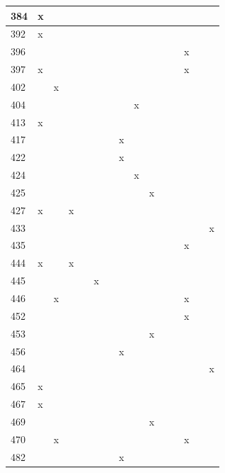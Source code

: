 \begin{landscape}
\begin{longtable}{|p{0.2in}|p{0.3in}|p{0.41in}|p{0.4in}|p{0.3in}|p{0.31in}|p{0.3in}|p{0.3in}|p{0.375in}|p{0.3in}|p{0.3in}|p{0.35in}|p{0.35in}|p{0.4in}|p{0.3in}|}
   384 & x &  &  &  &  &  &  &  &  &  &  &  &  &  \\  \hline
   392 & x &  &  &  &   &   &   &   &   &   &   &   &   &   \\  \hline
   396 &  &  &  &  &  &  &  &  &  &  &  & x &  &  \\  \hline
   397 & x &  &  &  &  &  &  &  &  &  &  & x &  &  \\  \hline
   402 &  & x &  &  &  &  &  &  &  &  &  &  &  &  \\  \hline
   404 &  &  &  &  &  &  &  & x &  &  &  &  &  &  \\  \hline
   413 & x &  &  &  &   &   &   &   &   &   &   &   &  &   \\  \hline
   417 &  &  &  &  &  &  & x &  &  &  &  &  &  &  \\  \hline
   422 &  &  &  &  &  &  & x &  &  &  &  &  &  &  \\  \hline
   424 &  &  &  &  &  &  &  & x &  &  &  &  &  &  \\  \hline
   425 &  &  &  &  &  &  &  &  & x &  &  &  &  &  \\  \hline
   427 & x &  & x &  &  &  &  &  &  &  &  &  &  &  \\  \hline
   433 &  &  &  &  &  &  &  &  &  &  &  &  &  & x \\  \hline
   435 &  &  &  &  &  &  &  &  &  &  &  & x &  &  \\  \hline
   444 & x &  & x &  &  &  &  &  &  &  &  &  &  &  \\  \hline
   445 &  &  &  &  & x &  &  &  &  &  &  &  &  &  \\  \hline
   446 &  & x &  &  &  &  &  &   &   &   &  & x &  &   \\  \hline
   452 &  &  &  &  &  &  &  &  &  &  &  & x &  &  \\  \hline
   453 &  &  &  &  &  &  &  &  & x &  &  &  &  &  \\  \hline
   456 &  &  &  &  &  &  & x &  &  &  &  &  &  &  \\  \hline
   464 &  &  &  &  &  &  &  &  &  &  &  &  &  & x \\  \hline
   465 & x &  &  &  &  &  &  &  &  &  &  &  &  &  \\  \hline
   467 & x &  &  &  &  &  &  &  &  &  &  &  &  &  \\  \hline
   469 &  &  &  &  &  &  &  &  & x &  &  &  &  &  \\  \hline
   470 &  & x &  &  &  &  &  &  &  &  &  & x &  &  \\  \hline
   482 &  &  &  &  &  &  & x &  &  &  &  &  &  &  \\  \hline

\end{longtable}
\end{landscape}
